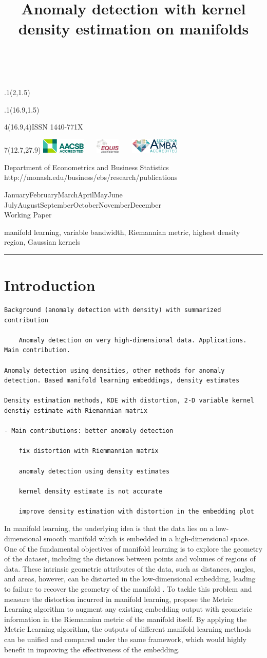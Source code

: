 \documentclass[11pt,a4paper,]{article}
\title{Anomaly detection with kernel density estimation on manifolds}
\date{\sf\Date~\Month~\Year}
\makeatletter
\def\Date{\number\day}
\def\Month{\ifcase\month\or
 January\or February\or March\or April\or May\or June\or
 July\or August\or September\or October\or November\or December\fi}
\def\Year{\number\year}
\def\showjel{{\large\textsf{\textbf{JEL classification:}}~\@jel}}
\def\cover{{\sffamily\setcounter{page}{0}
        \thispagestyle{empty}
        \placefig{2}{1.5}{width=5cm}{monash2}
        \placefig{16.9}{1.5}{width=2.1cm}{MBusSchool}
        \begin{textblock}{4}(16.9,4)ISSN 1440-771X\end{textblock}
        \begin{textblock}{7}(12.7,27.9)\hfill
        \includegraphics[height=0.7cm]{AACSB}~~~
        \includegraphics[height=0.7cm]{EQUIS}~~~
        \includegraphics[height=0.7cm]{AMBA}
        \end{textblock}
        \vspace*{2cm}
        \begin{center}\Large
        Department of Econometrics and Business Statistics\\[.5cm]
        \footnotesize http://monash.edu/business/ebs/research/publications
        \end{center}\vspace{2cm}
        \begin{center}
        \fbox{\parbox{14cm}{\begin{onehalfspace}\centering\Huge\vspace*{0.3cm}
                \textsf{\textbf{\expandafter{\@title}}}\vspace{1cm}\par
                \LARGE\@author\end{onehalfspace}
        }}
        \end{center}
        \vfill
                \begin{center}\Large
                \Month~\Year\\[1cm]
                Working Paper \@wp
        \end{center}\vspace*{2cm}}}
\def\pageone{{\sffamily\setstretch{1}%
        \thispagestyle{empty}%
        \vbox to \textheight{%
        \raggedright\baselineskip=1.2cm
     {\fontsize{24.88}{30}\sffamily\textbf{\expandafter{\@title}}}
        \vspace{2cm}\par
        \hspace{1cm}\parbox{14cm}{\sffamily\large\@addresses}\vspace{1cm}\vfill
        \hspace{1cm}{\large\Date~\Month~\Year}\\[1cm]
        \hspace{1cm}\showjel\vss}}}
\def\blindtitle{{\sffamily
     \thispagestyle{plain}\raggedright\baselineskip=1.2cm
     {\fontsize{24.88}{30}\sffamily\textbf{\expandafter{\@title}}}\vspace{1cm}\par
        }}
\def\titlepage{{\cover\newpage\pageone\newpage\blindtitle}}
\let\maketitle\titlepage
\newenvironment{keywords}{\par\vspace{0.5cm}\noindent{\sffamily\textbf{Keywords:}}}{\vspace{0.25cm}\par\hrule\vspace{0.5cm}\par}
\def\placefig#1#2#3#4{\begin{textblock}{.1}(#1,#2)\rlap{\texttt{[image: \#4]}}\end{textblock}}
\makeatother
\begin{document}
\maketitle
\begin{keywords}
manifold learning, variable bandwidth, Riemannian metric, highest density region, Gaussian kernels
\end{keywords}

\hypertarget{introduction}{%
\section{Introduction}\label{introduction}}

\begin{verbatim}
Background (anomaly detection with density) with summarized contribution

    Anomaly detection on very high-dimensional data. Applications. Main contribution.

Anomaly detection using densities, other methods for anomaly detection. Based manifold learning embeddings, density estimates

Density estimation methods, KDE with distortion, 2-D variable kernel denstiy estimate with Riemannian matrix

- Main contributions: better anomaly detection

    fix distortion with Riemmannian matrix

    anomaly detection using density estimates

    kernel density estimate is not accurate

    improve density estimation with distortion in the embedding plot
\end{verbatim}

In manifold learning, the underlying idea is that the data lies on a low-dimensional smooth manifold which is embedded in a high-dimensional space. One of the fundamental objectives of manifold learning is to explore the geometry of the dataset, including the distances between points and volumes of regions of data. These intrinsic geometric attributes of the data, such as distances, angles, and areas, however, can be distorted in the low-dimensional embedding, leading to failure to recover the geometry of the manifold \autocite{Goldberg2008-co}. To tackle this problem and measure the distortion incurred in manifold learning, \textcite{Perrault-Joncas2013-pq} propose the Metric Learning algorithm to augment any existing embedding output with geometric information in the Riemannian metric of the manifold itself. By applying the Metric Learning algorithm, the outputs of different manifold learning methods can be unified and compared under the same framework, which would highly benefit in improving the effectiveness of the embedding.
\end{document}
